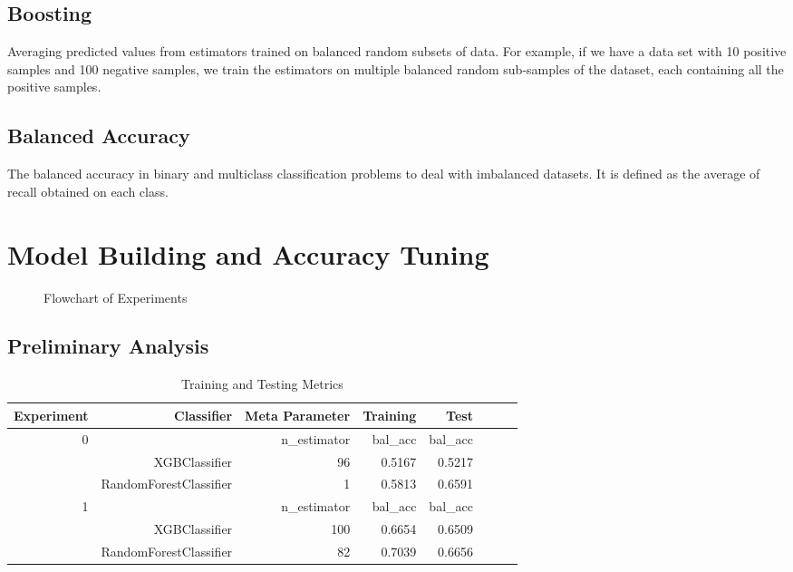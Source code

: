 \documentclass[10pt]{article}
\begin{document}
\subsection{Boosting}
Averaging predicted values from estimators trained on balanced random
subsets of data. For example, if we have a data set with 10 positive
samples and 100 negative samples, we train the estimators on multiple
balanced random sub-samples of the dataset, each containing all the 
positive samples.\par
\subsection{Balanced Accuracy}
The balanced accuracy in binary and multiclass classification problems to
deal with imbalanced datasets. It is defined as the average of recall
obtained on each class.

\section{Model Building and Accuracy Tuning}
\begin{figure}[H]
    \centering
    
    \caption{Flowchart of Experiments}
\end{figure}
\subsection{Preliminary Analysis}
\begin{table}[H]
    \caption{Training and Testing Metrics}
    \centering
    \begin{tabular}{|r|r|r|r|r|r|r|r|r|}
        \hline
        Experiment &Classifier &\multicolumn{2}{|r|}{Meta Parameter}
        &Training
        &Test\\
        \hline
        \hline
        0 & &\multicolumn{2}{|r|}{n\_estimator}
        &bal\_acc
        &bal\_acc\\
        \hline
        &XGBClassifier &\multicolumn{2}{|r|}{96} &0.5167 &0.5217\\
        \hline
        &RandomForestClassifier &\multicolumn{2}{|r|}{1} &0.5813 &0.6591\\
        \hline
        \hline
        1 & &\multicolumn{2}{|r|}{n\_estimator}
        &bal\_acc
        &bal\_acc\\
        \hline
        &XGBClassifier &\multicolumn{2}{|r|}{100} &0.6654 &0.6509\\
        \hline
        &RandomForestClassifier &\multicolumn{2}{|r|}{82} &0.7039 &0.6656\\
        \hline
    \end{tabular}
\end{table}
\end{document}
